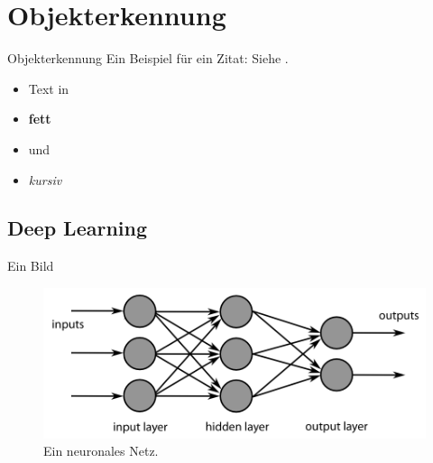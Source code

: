 \section{Objekterkennung}

\begin{frame}{Objekterkennung}
    Ein Beispiel f\"ur ein Zitat: Siehe \cite{hands_on}.
    \begin{itemize}
        \item Text in
        \item \textbf{fett}
        \item und
        \item \textit{kursiv}
    \end{itemize}
\end{frame}

\subsection{Deep Learning}

\begin{frame}{Ein Bild}
    \begin{figure}
        \includegraphics[height=0.5\textheight]{bilder/neuronales_netz.png}
        \caption{Ein neuronales Netz.}
    \end{figure}
\end{frame}